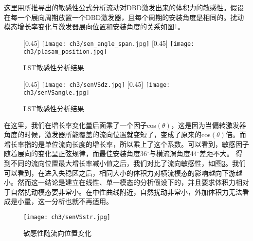 这里用所推导出的敏感性公式分析流动对DBD激发出来的体积力的敏感性。假设在每一个展向周期放置一个DBD激发器，且每个周期的安装角度是相同的。扰动模态增长率变化与激发器展向位置和安装角度的关系如图\ref{f:senVSangle_span}。
\begin{figure}[htb]
  \centering
  [0.45\textwidth]
  {\texttt{[image: ch3/sen\_angle\_span.jpg]}}
  [0.45\textwidth]
  {\texttt{[image: ch3/plasam\_position.jpg]}}
  \caption{LST敏感性分析结果}\label{f:senVSangle_span}
\end{figure}
\begin{figure}[htb]
  \centering
  [0.45\textwidth]
  {\texttt{[image: ch3/senVSdz.jpg]}}
  [0.45\textwidth]
  {\texttt{[image: ch3/senVSangle.jpg]}}
  \caption{LST敏感性分析结果}\label{f:senVSangle_span2}
\end{figure}
在这里，我们在增长率变化量后面乘了一个因子cos$(\theta)$，这是因为当偏转激发器角度的时候，激发器所能覆盖的流向位置就变短了，变成了原来的cos$(\theta)$倍。而增长率指的是单位流向长度的增长率，所以乘上了这个系数。可以看到，敏感因子随着展向的变化呈正弦规律，而最佳安装角度36$^\circ$与横流涡角度44$^\circ$差距不大。
得到不同的流向位置最大增长率减小值之后，我们对比了流向敏感性，如图\ref{f:senVSstr}。我们可以看到，在进入失稳区之后，相同大小的体积力对横流模态的影响越向下游越小。然而这一结论是建立在线性、单一模态的分析假设下的，并且要求体积力相对于自然扰动模态要非常小。在中性曲线附近，自然扰动非常小，外加体积力无法看成是小量，这一分析也就不再适用。
\begin{figure}
  \centering
  \texttt{[image: ch3/senVSstr.jpg]}
  \caption{敏感性随流向位置变化}\label{f:senVSstr}
\end{figure}

